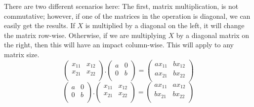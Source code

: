 \documentclass[600paper, 11pt,twoside,openany]{kdp}
\begin{document}
\indent There are two different scenarios here: The first, matrix multiplication, is not commutative; however, if one of the matrices in the operation is diagonal, we can easily get the results. If $X$ is multiplied by a diagonal on the left, it will change the matrix row-wise. Otherwise, if we are multiplying $X$ by a diagonal matrix on the right, then this will have an impact column-wise. This will apply to any matrix size.
\[\begin{pmatrix}
x_{11} & x_{12}  \\
x_{21} & x_{22}  \\
\end{pmatrix}.\begin{pmatrix}
a & 0 \\
0 & b \\
\end{pmatrix} = \begin{pmatrix}
ax_{11} & bx_{12}  \\
ax_{21} & bx_{22}  \\
\end{pmatrix}
\]
\[\begin{pmatrix}
a & 0 \\
0 & b \\
\end{pmatrix}.\begin{pmatrix}
x_{11} & x_{12}  \\
x_{21} & x_{22}  \\
\end{pmatrix} = \begin{pmatrix}
ax_{11} & ax_{12}  \\
bx_{21} & bx_{22}  \\
\end{pmatrix}
\]
\end{document}
